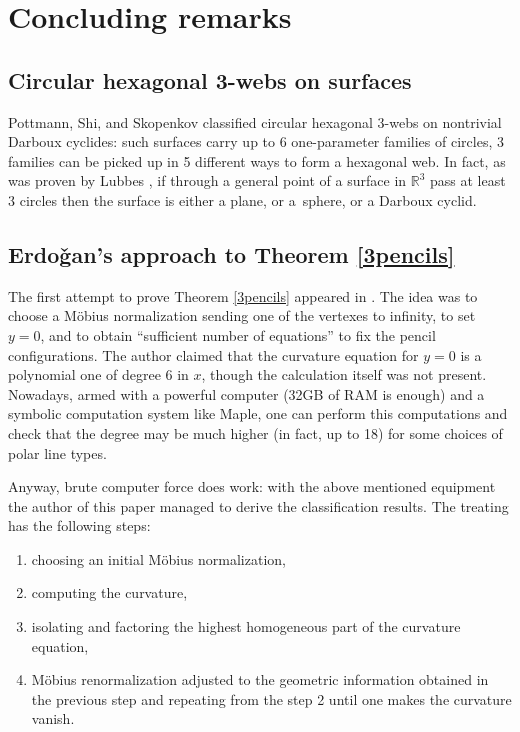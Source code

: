 \documentclass[pdftex]{sigma}
\numberwithin{equation}{section}
\begin{document}
 \section{Concluding remarks}

\subsection{Circular hexagonal 3-webs on surfaces}

Pottmann, Shi, and Skopenkov \cite{PSS-12} classified circular hexagonal 3-webs on nontrivial Darboux cyclides: such surfaces carry up to 6 one-parameter families of circles, 3 families can be picked up in 5 different ways to form a hexagonal web. In fact, as was proven by Lubbes \cite{L-21}, if through a general point of a surface in $\mathbb{R}^3$ pass at least 3 circles then the surface is either a plane, or a~sphere, or a Darboux cyclid.

\subsection[Erdogan's approach to Theorem 4.5]{Erdo\v{g}an's approach to Theorem \ref{3pencils}}

The first attempt to prove Theorem \ref{3pencils} appeared in \cite{E-89}. The idea was to choose a M\"obius normalization sending one of the vertexes to infinity, to set $y=0$, and to obtain ``sufficient number of equations'' to fix the pencil configurations. The author claimed that the curvature equation for $y=0$ is a polynomial one of degree 6 in $x$, though the calculation itself was not present. Nowadays, armed with a powerful computer (32GB of RAM is enough) and a symbolic computation system like Maple, one can perform this computations and check that the degree may be much higher (in fact, up to 18) for some choices of polar line types.

Anyway, brute computer force does work: with the above mentioned equipment the author of this paper managed to derive the classification results.
The treating has the following steps:
\begin{enumerate}\itemsep=0pt
\item[(1)] choosing an initial M\"obius normalization,
\item[(2)] computing the curvature,
\item[(3)] isolating and factoring the highest homogeneous part of the curvature equation,
\item[(4)] M\"obius renormalization adjusted to the geometric information obtained in the previous step and repeating from the step 2 until one makes the curvature vanish.
\end{enumerate}
\end{document}
